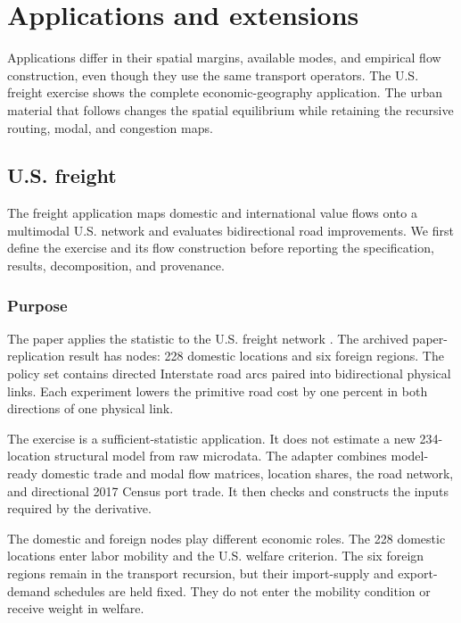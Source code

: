 \section{Applications and extensions}
\label{ch:applications}

Applications differ in their spatial margins, available modes, and empirical
flow construction, even though they use the same transport operators. The U.S.
freight exercise shows the complete economic-geography application. The urban
material that follows changes the spatial equilibrium while retaining the
recursive routing, modal, and congestion maps.

\subsection{U.S. freight}
\label{ch:rsue}

The freight application maps domestic and international value flows onto a
multimodal U.S. network and evaluates bidirectional road improvements. We
first define the exercise and its flow construction before reporting the
specification, results, decomposition, and provenance.

\subsubsection{Purpose}

The paper applies the statistic to the U.S. freight network
\citep{AllenFuchsWong2026}. The archived paper-replication result has
\GuideRSUENodeCount{} nodes: 228 domestic locations and six foreign regions.
The policy set contains \GuideRSUEDirectedArcCount{} directed Interstate road
arcs paired into \GuideRSUEPhysicalLinkCount{} bidirectional physical links.
Each experiment lowers the primitive road cost by one percent in both
directions of one physical link.

The exercise is a sufficient-statistic application. It does not estimate a
new 234-location structural model from raw microdata. The adapter combines
model-ready domestic trade and modal flow matrices, location shares, the road
network, and directional 2017 Census port trade. It then checks and constructs
the inputs required by the derivative.

The domestic and foreign nodes play different economic roles. The 228 domestic
locations enter labor mobility and the U.S. welfare criterion. The six foreign
regions remain in the transport recursion, but their import-supply and
export-demand schedules are held fixed. They do not enter the mobility
condition or receive weight in welfare.

